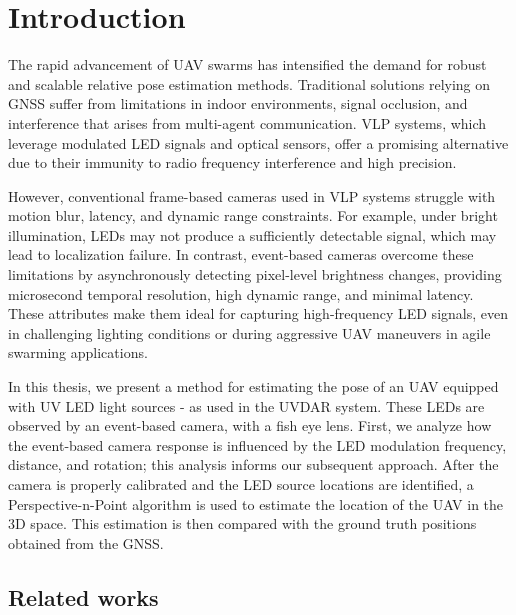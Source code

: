 
\chapter{Introduction\label{chap:introduction}}

The rapid advancement of \ac{UAV} swarms has intensified the demand for robust and scalable relative pose estimation methods.
Traditional solutions relying on \ac{GNSS} suffer from limitations in indoor environments, signal occlusion, and interference that arises from
multi-agent communication.
\ac{VLP} systems, which leverage modulated \ac{LED} signals and optical sensors, offer a promising alternative due to their immunity to radio
frequency interference and high precision.

However, conventional frame-based cameras used in \ac{VLP} systems struggle with motion blur, latency,
and dynamic range constraints. For example, under bright illumination, \ac{LED}s may not produce a sufficiently detectable signal,
which may lead to localization failure. In contrast, event-based cameras overcome these limitations by asynchronously detecting pixel-level
brightness changes, providing microsecond temporal resolution, high dynamic range, and minimal latency.\cite{gallego22event} These attributes make them ideal for
capturing high-frequency LED signals, even in challenging lighting conditions or during aggressive \ac{UAV} maneuvers in agile swarming applications.

In this thesis, we present a method for estimating the pose of an \ac{UAV} equipped with \ac{UV} \ac{LED} light sources - as used
in the UVDAR\cite{walteruvdar} system. These \ac{LED}s are observed by an event-based camera, with a fish eye lens. 
First, we analyze how the event-based camera response is influenced by the \ac{LED} modulation frequency, distance, and rotation;
this analysis informs our subsequent approach.
After the camera is properly calibrated and the LED source locations are identified, a Perspective-n-Point 
algorithm is used to estimate the location of the \ac{UAV} in the 3D space. This estimation is then compared with the ground truth positions obtained
from the \ac{GNSS}.


\section{Related works}

